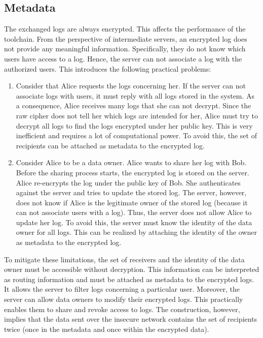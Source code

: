 \documentclass[../main.tex]{subfiles}
\begin{document}
\subsection{Metadata}
\label{sec:metadata}
The exchanged logs are always encrypted.
This affects the performance of the toolchain.
From the perspective of intermediate servers, an encrypted log does not provide any meaningful information.
Specifically, they do not know which users have access to a log.
Hence, the server can not associate a log with the authorized users.
This introduces the following practical problems:
\begin{enumerate}
    \item 
    Consider that Alice requests the logs concerning her.
    If the server can not associate logs with users, it must reply with all logs stored in the system.
    As a consequence, Alice receives many logs that she can not decrypt.
    Since the raw cipher does not tell her which logs are intended for her, Alice must try to decrypt all logs to find the logs encrypted under her public key.
    This is very inefficient and requires a lot of computational power.
    To avoid this, the set of recipients can be attached as metadata to the encrypted log.
    \item 
    Consider Alice to be a data owner.
    Alice wants to share her log with Bob.
    Before the sharing process starts, the encrypted log is stored on the server.
    Alice re-encrypts the log under the public key of Bob.
    She authenticates against the server and tries to update the stored log.
    The server, however, does not know if Alice is the legitimate owner of the stored log (because it can not associate users with a log).
    Thus, the server does not allow Alice to update her log.
    To avoid this, the server must know the identity of the data owner for all logs.
    This can be realized by attaching the identity of the owner as metadata to the encrypted log.
\end{enumerate}
To mitigate these limitations, the set of receivers and the identity of the data owner must be accessible without decryption.
This information can be interpreted as routing information and must be attached as metadata to the encrypted logs.
It allows the server to filter logs concerning a particular user.
Moreover, the server can allow data owners to modify their encrypted logs.
This practically enables them to share and revoke access to logs.
The construction, however, implies that the data sent over the insecure network contains the set of recipients twice (once in the metadata and once within the encrypted data).
\end{document}
